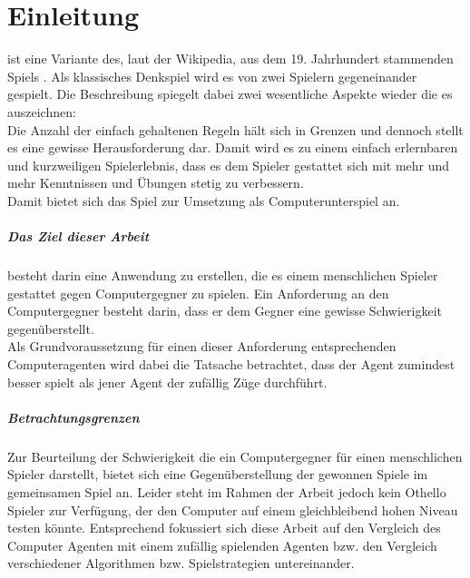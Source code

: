 \chapter{Einleitung}

 ist eine Variante des, laut der Wikipedia, aus dem 19. Jahrhundert stammenden Spiels  \cite{Wiki:EN:Reversi}. Als klassisches Denkspiel wird es von zwei Spielern gegeneinander gespielt. Die Beschreibung  \cite{Rose} spiegelt dabei zwei wesentliche Aspekte wieder die es auszeichnen:
\\Die Anzahl der einfach gehaltenen Regeln hält sich in Grenzen und dennoch stellt es eine gewisse Herausforderung dar. Damit wird es zu einem einfach erlernbaren und kurzweiligen Spielerlebnis, dass es dem Spieler gestattet sich mit mehr und mehr Kenntnissen und Übungen stetig zu verbessern.
\\Damit bietet sich das Spiel zur Umsetzung als Computerunterspiel an.
\paragraph{Das Ziel dieser Arbeit} besteht darin eine Anwendung zu erstellen, die es einem menschlichen Spieler gestattet gegen Computergegner  zu spielen. Ein Anforderung an den Computergegner besteht darin, dass er dem Gegner eine gewisse Schwierigkeit gegenüberstellt.
\\Als Grundvoraussetzung für einen dieser Anforderung entsprechenden Computeragenten wird dabei die Tatsache betrachtet, dass der Agent zumindest besser spielt als jener Agent der zufällig Züge durchführt.
\paragraph{Betrachtungsgrenzen}
Zur Beurteilung der Schwierigkeit die ein Computergegner für einen menschlichen Spieler darstellt, bietet sich eine Gegenüberstellung der gewonnen Spiele im gemeinsamen Spiel an. Leider steht im Rahmen der Arbeit jedoch kein Othello Spieler zur Verfügung, der den Computer auf einem gleichbleibend hohen Niveau testen könnte. Entsprechend fokussiert sich diese Arbeit auf den Vergleich des Computer Agenten mit einem zufällig spielenden Agenten bzw. den Vergleich verschiedener Algorithmen bzw. Spielstrategien untereinander.
\newpage
